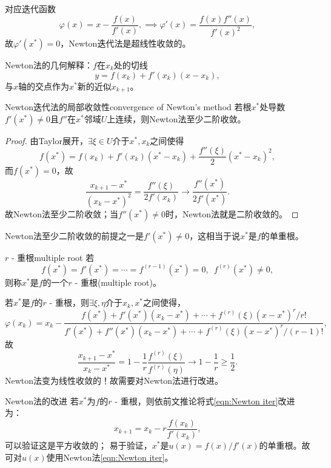 \begin{corollary}
    对应迭代函数
    \[
        \varphi(x)=x-\frac{f(x)}{f'(x)},\implies\varphi'(x)=\frac{f(x)f''(x)}{f'(x)^2},
    \]
    故$\varphi'(x^*)=0$，Newton迭代法是超线性收敛的。
\end{corollary}

\begin{remark}
    Newton法的几何解释：$f$在$x_k$处的切线
    \[
        y=f(x_k)+f'(x_k)(x-x_k),
    \]
    与$x$轴的交点作为$x^*$新的近似$x_{k+1}$。
\end{remark}

\begin{theorem}
    {Newton迭代法的局部收敛性}{convergence of Newton's method}
    若根$x^*$处导数$f'(x^*)\neq 0$且$f''$在$x^*$邻域$U$上连续，则Newton法至少二阶收敛。
\end{theorem}

\begin{proof}
    由Taylor展开，$\exists\xi\in U$介于$x^*,x_k$之间使得
    \[
        f(x^*)=f(x_k)+f'(x_k)(x^*-x_k)+\frac{f''(\xi)}2(x^*-x_k)^2,
    \]
    而$f(x^*)=0$，故
    \[
        \frac{x_{k+1}-x^*}{(x_k-x^*)^2}=\frac{f''(\xi)}{2f'(x_k)}\to\frac{f''(x^*)}{2f'(x^*)}.
    \]
    故Newton法至少二阶收敛；当$f''(x^*)\neq 0$时，Newton法就是二阶收敛的。
\end{proof}

\begin{remark}
    Newton法至少二阶收敛的前提之一是$f'(x^*)\neq 0$，这相当于说$x^*$是$f$的单重根。
\end{remark}

\begin{definition}
    {$r$ - 重根}{multiple root}
    若
    \[
        f(x^*)=f'(x^*)=\cdots=f^{(r-1)}(x^*)=0,\enspace f^{(r)}(x^*)\neq 0,
    \]
    则称$x^*$是$f$的一个$r$ - 重根(multiple root)。
\end{definition}

\begin{corollary}
    若$x^*$是$f$的$r$ - 重根，则$\exists\xi,\eta$介于$x_k,x^*$之间使得，
    \[
        \varphi(x_k)=x_k-\frac{f(x^*)+f'(x^*)(x_k-x^*)+\cdots+f^{(r)}(\xi)(x-x^*)^r/r!}{f'(x^*)+f''(x^*)(x_k-x^*)+\cdots+f^{(r)}(\xi)(x-x^*)^r/(r-1)!},
    \]
    故
    \[
        \frac{x_{k+1}-x^*}{x_k-x^*}=1-\frac1r\frac{f^{(r)}(\xi)}{f^{(r)}(\eta)}\to1-\frac1r\geq\frac12.
    \]
    Newton法变为线性收敛的！故需要对Newton法进行改进。
\end{corollary}

\begin{theorem}
    {Newton法的改进}{}
    若$x^*$为$f$的$r$ - 重根，则依前文推论将式\eqref{eqn:Newton iter}改进为： 
    \begin{equation}
        \label{eqn:Newton iter r-multiroot}
        x_{k+1}=x_k-r\frac{f(x_k)}{f'(x_k)},
    \end{equation}
    可以验证这是平方收敛的；
    \tcblower
    易于验证，$x^*$是$u(x)=f(x)/f'(x)$的单重根。故可对$u(x)$使用Newton法\eqref{eqn:Newton iter}。
\end{theorem}

